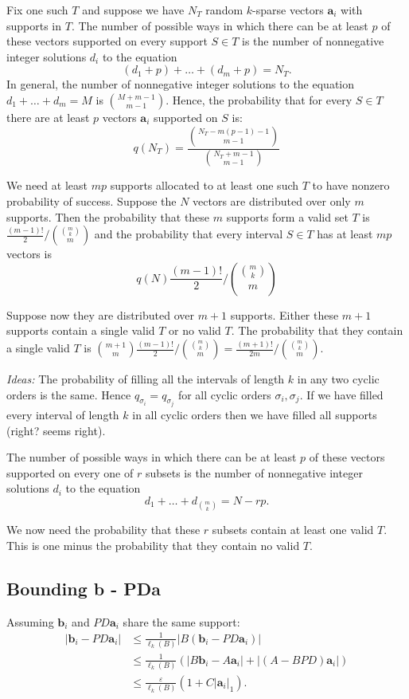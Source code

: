 \documentclass[journal, onecolumn]{IEEEtran}
\begin{document}
Fix one such $T$ and suppose we have $N_T$ random $k$-sparse vectors $\mathbf{a}_i$ with supports in $T$. The number of possible ways in which there can be at least $p$ of these vectors supported on every support $S \in T$ is the number of nonnegative integer solutions $d_i$ to the equation
\[ (d_1 + p) + \ldots + (d_m + p) = N_T.\]
%
In general, the number of nonnegative integer solutions to the equation $d_1 + \ldots + d_m = M$ is ${M+m-1 \choose m-1}$. Hence, the probability that for every $S \in T$ there are at least $p$ vectors $\mathbf{a}_i$ supported on $S$ is:
\[ q(N_T) = \frac{ { N_T-m(p-1)-1 \choose m-1 } }{ {N_T+m-1 \choose m-1} } \]

We need at least $mp$ supports allocated to at least one such $T$ to have nonzero probability of success. Suppose the $N$ vectors are distributed over only $m$ supports. Then the probability that these $m$ supports form a valid set $T$ is $\frac{(m-1)!}{2} / { {m \choose k} \choose m}$ and the probability that every interval $S \in T$ has at least $mp$ vectors is 
\[ q(N) \frac{(m-1)!}{2} / { {m \choose k} \choose m}\]

Suppose now they are distributed over $m+1$ supports. Either these $m+1$ supports contain a single valid $T$ or no valid $T$. The probability that they contain a single valid $T$ is ${m+1 \choose m} \frac{(m-1)!}{2} / { {m \choose k} \choose m} = \frac{(m+1)!}{2m} / { {m \choose k} \choose m}$.

\emph{Ideas:} The probability of filling all the intervals of length $k$ in any two cyclic orders is the same. Hence $q_{\sigma_i} = q_{\sigma_j}$ for all cyclic orders $\sigma_i, \sigma_j$. If we have filled every interval of length $k$ in all cyclic orders then we have filled all supports (right? seems right).

The number of possible ways in which there can be at least $p$ of these vectors supported on every one of $r$ subsets is the number of nonnegative integer solutions $d_i$ to the equation
\[ d_1 + \ldots + d_{{m \choose k} }= N - rp.\]

We now need the probability that these $r$ subsets contain at least one valid $T$.  This is one minus the probability that they contain no valid $T$. 

\subsection{Bounding b - PDa}

Assuming $\mathbf{b}_i$ and $PD\mathbf{a}_i$ share the same support:
\begin{align*}
|\mathbf{b}_i - PD\mathbf{a}_i| 
&\leq \frac{1}{\ell_{k}(B)}|B(\mathbf{b}_i - PD\mathbf{a}_i)| \\
&\leq \frac{1}{\ell_{k}(B)} (|B\mathbf{b}_i - A\mathbf{a}_i| + |(A - BPD)\mathbf{a}_i|) \\
&\leq \frac{\varepsilon}{\ell_{k}(B)}(1+C|\mathbf{a}_i|_1).
\end{align*}
\end{document}
